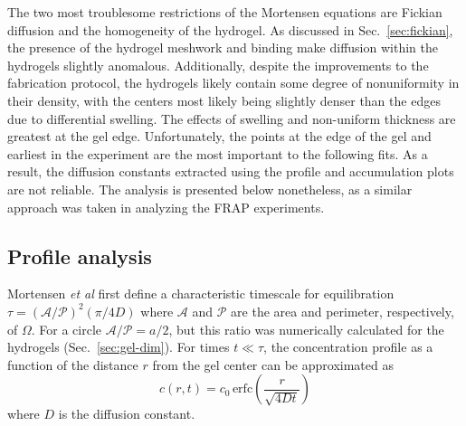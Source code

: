 The two most troublesome restrictions of the Mortensen equations are Fickian diffusion and the homogeneity of the hydrogel.  As discussed in Sec.~\ref{sec:fickian}, the presence of the hydrogel meshwork and binding make diffusion within the hydrogels slightly anomalous.  Additionally, despite the improvements to the fabrication protocol, the hydrogels likely contain some degree of nonuniformity in their density, with the centers most likely being slightly denser than the edges due to differential swelling.  The effects of swelling and non-uniform thickness are greatest at the gel edge.  Unfortunately, the points at the edge of the gel and earliest in the experiment are the most important to the following fits.  As a result, the diffusion constants extracted using the profile and accumulation plots are not reliable.  The analysis is presented below nonetheless, as a similar approach was taken in analyzing the FRAP experiments.

\subsection{Profile analysis}
\label{sec:profile-analysis}

Mortensen \textit{et al} first define a characteristic timescale for equilibration $\tau = (\mathcal{A}/\mathcal{P})^2 (\pi/4D)$ where $\mathcal{A}$ and $\mathcal{P}$ are the area and perimeter, respectively, of $\Omega$.  For a circle $\mathcal{A}/\mathcal{P} = a/2$, but this ratio was numerically calculated for the hydrogels (Sec.~\ref{sec:gel-dim}).  For times $t \ll \tau$, the concentration profile as a function of the distance $r$ from the gel center can be approximated as 
\begin{equation}
c(r,t) = c_0 \,\mathrm{erfc}\left(\frac{r}{\sqrt{4Dt}}\right)
\label{eq:approx-profile}
\end{equation}
where $D$ is the diffusion constant.


